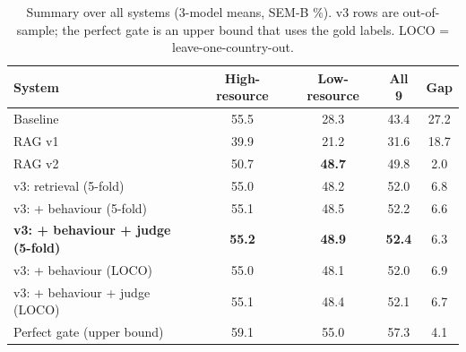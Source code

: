 \documentclass[11pt]{article}
\begin{document}
\begin{table}[h]
\centering
\caption{Summary over all systems (3-model means, SEM-B \%). v3 rows are out-of-sample; the perfect
gate is an upper bound that uses the gold labels. LOCO = leave-one-country-out.}
\label{tab:v3sum}
\begin{tabular}{l|ccc|c}
\toprule
System & High-resource & Low-resource & All 9 & Gap \\
\midrule
Baseline                              & 55.5 & 28.3 & 43.4 & 27.2 \\
RAG v1                                & 39.9 & 21.2 & 31.6 & 18.7 \\
RAG v2                                & 50.7 & \textbf{48.7} & 49.8 & 2.0 \\
v3: retrieval (5-fold) & 55.0 & 48.2 & 52.0 & 6.8 \\
v3: + behaviour (5-fold) & 55.1 & 48.5 & 52.2 & 6.6 \\
\textbf{v3: + behaviour + judge (5-fold)} & \textbf{55.2} & \textbf{48.9} & \textbf{52.4} & 6.3 \\
v3: + behaviour (LOCO) & 55.0 & 48.1 & 52.0 & 6.9 \\
v3: + behaviour + judge (LOCO) & 55.1 & 48.4 & 52.1 & 6.7 \\
\midrule
Perfect gate (upper bound)            & 59.1 & 55.0 & 57.3 & 4.1 \\
\bottomrule
\end{tabular}
\end{table}
\end{document}
